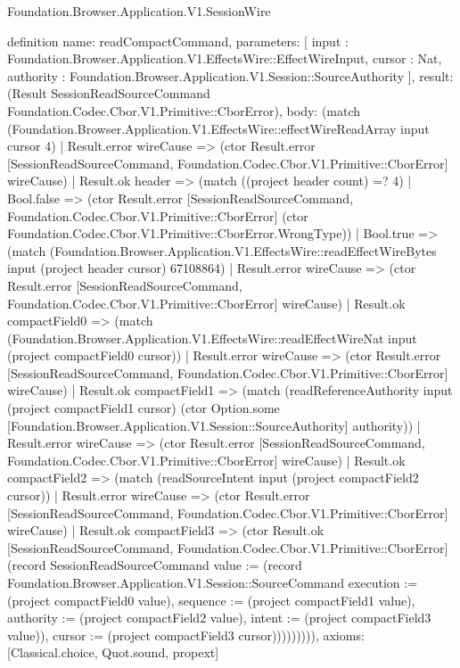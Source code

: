 \begin{lexlean}{Foundation.Browser.Application.V1.SessionWire}
\begin{semanticmodule}
definition{
  name: readCompactCommand,
  parameters: [
    input : Foundation.Browser.Application.V1.EffectsWire::EffectWireInput,
    cursor : Nat,
    authority : Foundation.Browser.Application.V1.Session::SourceAuthority
  ],
  result: (Result SessionReadSourceCommand Foundation.Codec.Cbor.V1.Primitive::CborError),
  body: (match (Foundation.Browser.Application.V1.EffectsWire::effectWireReadArray input cursor 4)
    | Result.error wireCause => (ctor Result.error [SessionReadSourceCommand, Foundation.Codec.Cbor.V1.Primitive::CborError] wireCause)
    | Result.ok header => (match ((project header count) =? 4)
      | Bool.false => (ctor Result.error [SessionReadSourceCommand, Foundation.Codec.Cbor.V1.Primitive::CborError] (ctor Foundation.Codec.Cbor.V1.Primitive::CborError.WrongType))
      | Bool.true => (match (Foundation.Browser.Application.V1.EffectsWire::readEffectWireBytes input (project header cursor) 67108864)
        | Result.error wireCause => (ctor Result.error [SessionReadSourceCommand, Foundation.Codec.Cbor.V1.Primitive::CborError] wireCause)
        | Result.ok compactField0 => (match (Foundation.Browser.Application.V1.EffectsWire::readEffectWireNat input (project compactField0 cursor))
          | Result.error wireCause => (ctor Result.error [SessionReadSourceCommand, Foundation.Codec.Cbor.V1.Primitive::CborError] wireCause)
          | Result.ok compactField1 => (match (readReferenceAuthority input (project compactField1 cursor) (ctor Option.some [Foundation.Browser.Application.V1.Session::SourceAuthority] authority))
            | Result.error wireCause => (ctor Result.error [SessionReadSourceCommand, Foundation.Codec.Cbor.V1.Primitive::CborError] wireCause)
            | Result.ok compactField2 => (match (readSourceIntent input (project compactField2 cursor))
              | Result.error wireCause => (ctor Result.error [SessionReadSourceCommand, Foundation.Codec.Cbor.V1.Primitive::CborError] wireCause)
              | Result.ok compactField3 => (ctor Result.ok [SessionReadSourceCommand, Foundation.Codec.Cbor.V1.Primitive::CborError] (record SessionReadSourceCommand {value := (record Foundation.Browser.Application.V1.Session::SourceCommand {execution := (project compactField0 value), sequence := (project compactField1 value), authority := (project compactField2 value), intent := (project compactField3 value)}), cursor := (project compactField3 cursor)})))))))),
  axioms: [Classical.choice, Quot.sound, propext]
}


\end{semanticmodule}
\end{lexlean}
